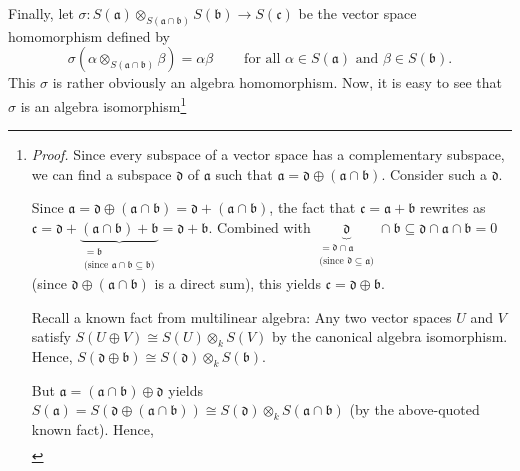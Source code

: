 \documentclass
[numbers=enddot,12pt,final,onecolumn,german,notitlepage]{scrartcl}%
\theoremstyle{definition}
\begin{document}
Finally, let $\sigma:S\left(  \mathfrak{a}\right)  \otimes_{S\left(
\mathfrak{a}\cap\mathfrak{b}\right)  }S\left(  \mathfrak{b}\right)
\rightarrow S\left(  \mathfrak{c}\right)  $ be the vector space homomorphism
defined by%
\[
\sigma\left(  \alpha\otimes_{S\left(  \mathfrak{a}\cap\mathfrak{b}\right)
}\beta\right)  =\alpha\beta\ \ \ \ \ \ \ \ \ \ \text{for all }\alpha\in
S\left(  \mathfrak{a}\right)  \text{ and }\beta\in S\left(  \mathfrak{b}%
\right)  .
\]
This $\sigma$ is rather obviously an algebra homomorphism. Now, it is easy to
see that $\sigma$ is an algebra isomorphism\footnote{\textit{Proof.} Since
every subspace of a vector space has a complementary subspace, we can find a
subspace $\mathfrak{d}$ of $\mathfrak{a}$ such that $\mathfrak{a}%
=\mathfrak{d}\oplus\left(  \mathfrak{a}\cap\mathfrak{b}\right)  $. Consider
such a $\mathfrak{d}$.
\par
Since $\mathfrak{a}=\mathfrak{d}\oplus\left(  \mathfrak{a}\cap\mathfrak{b}%
\right)  =\mathfrak{d}+\left(  \mathfrak{a}\cap\mathfrak{b}\right)  $, the
fact that $\mathfrak{c}=\mathfrak{a}+\mathfrak{b}$ rewrites as $\mathfrak{c}%
=\mathfrak{d}+\underbrace{\left(  \mathfrak{a}\cap\mathfrak{b}\right)
+\mathfrak{b}}_{\substack{=\mathfrak{b}\\\text{(since }\mathfrak{a}%
\cap\mathfrak{b}\subseteq\mathfrak{b}\text{)}}}=\mathfrak{d}+\mathfrak{b}$.
Combined with $\underbrace{\mathfrak{d}}_{\substack{=\mathfrak{d}%
\cap\mathfrak{a}\\\text{(since }\mathfrak{d}\subseteq\mathfrak{a}\text{)}%
}}\cap\mathfrak{b}\subseteq\mathfrak{d}\cap\mathfrak{a}\cap\mathfrak{b}=0$
(since $\mathfrak{d}\oplus\left(  \mathfrak{a}\cap\mathfrak{b}\right)  $ is a
direct sum), this yields $\mathfrak{c}=\mathfrak{d}\oplus\mathfrak{b}$.
\par
Recall a known fact from multilinear algebra: Any two vector spaces $U$ and
$V$ satisfy $S\left(  U\oplus V\right)  \cong S\left(  U\right)  \otimes
_{k}S\left(  V\right)  $ by the canonical algebra isomorphism. Hence,
$S\left(  \mathfrak{d}\oplus\mathfrak{b}\right)  \cong S\left(  \mathfrak{d}%
\right)  \otimes_{k}S\left(  \mathfrak{b}\right)  $.
\par
But $\mathfrak{a}=\left(  \mathfrak{a}\cap\mathfrak{b}\right)  \oplus
\mathfrak{d}$ yields $S\left(  \mathfrak{a}\right)  =S\left(  \mathfrak{d}%
\oplus\left(  \mathfrak{a}\cap\mathfrak{b}\right)  \right)  \cong S\left(
\mathfrak{d}\right)  \otimes_{k}S\left(  \mathfrak{a}\cap\mathfrak{b}\right)
$ (by the above-quoted known fact). Hence,%
\begin{align*}

\end{align*}}
\end{document}
